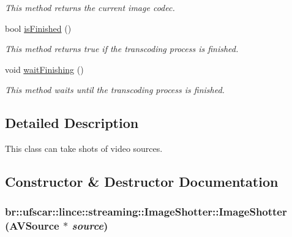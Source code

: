 \begin{DoxyCompactItemize}
\begin{DoxyCompactList}\small\item\em This method returns the current image codec. \item\end{DoxyCompactList}\item 
bool \hyperlink{classbr_1_1ufscar_1_1lince_1_1streaming_1_1ImageShotter_af48a5173662f7dea91dc8140f5e501cc}{isFinished} ()
\begin{DoxyCompactList}\small\item\em This method returns true if the transcoding process is finished. \item\end{DoxyCompactList}\item 
void \hyperlink{classbr_1_1ufscar_1_1lince_1_1streaming_1_1ImageShotter_ac65dc640a0e5d28661029fb387f18a1a}{waitFinishing} ()
\begin{DoxyCompactList}\small\item\em This method waits until the transcoding process is finished. \item\end{DoxyCompactList}\end{DoxyCompactItemize}


\subsection{Detailed Description}
This class can take shots of video sources. 

\subsection{Constructor \& Destructor Documentation}
\hypertarget{classbr_1_1ufscar_1_1lince_1_1streaming_1_1ImageShotter_a83721159b935035fefd943dd07ce9c45}{
\subsubsection[{ImageShotter}]{\setlength{\rightskip}{0pt plus 5cm}br::ufscar::lince::streaming::ImageShotter::ImageShotter ({\bf AVSource} $\ast$ {\em source})}}
\label{classbr_1_1ufscar_1_1lince_1_1streaming_1_1ImageShotter_a83721159b935035fefd943dd07ce9c45}


